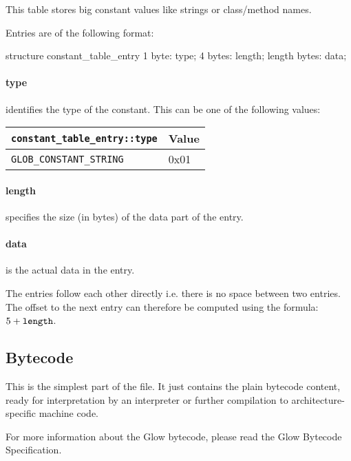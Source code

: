 \documentclass[12pt]{article}
\begin{document}
This table stores big constant values like strings or class/method names.

Entries are of the following format:

\begin{code}[language=C]
structure constant_table_entry {
    1 byte:       type;
    4 bytes:      length;
    length bytes: data;
}
\end{code}

\paragraph{type} identifies the type of the constant. This can be one of the following values:

\begin{tabular}{| l | l |}
\hline
\verb|constant_table_entry::type| & Value \\
\hline \hline
\verb|GLOB_CONSTANT_STRING| & 0x01 \\
\hline
\end{tabular}

\paragraph{length} specifies the size (in bytes) of the data part of the entry.

\paragraph{data} is the actual data in the entry.

The entries follow each other directly i.e. there is no space between two entries. The offset
to the next entry can therefore be computed using the formula: \(5 + \verb|length|\).


\subsection*{Bytecode}

This is the simplest part of the file. It just contains the plain bytecode content, ready for interpretation
by an interpreter or further compilation to architecture-specific machine code.

For more information about the Glow bytecode, please read the Glow Bytecode Specification.
\end{document}
